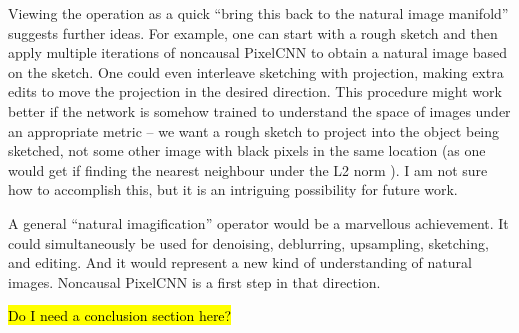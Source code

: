 \documentclass[10pt,a4paper]{article}
\newcommand{\nquote}[1]{``{#1}''}
\begin{document}
Viewing the operation as a quick \nquote{bring this back to the natural image manifold} suggests further ideas. For example, one can start with a rough sketch and then apply multiple iterations of noncausal PixelCNN to obtain a natural image based on the sketch. One could even interleave sketching with projection, making extra edits to move the projection in the desired direction. This procedure might work better if the network is somehow trained to understand the space of images under an appropriate metric -- we want a rough sketch to project into the object being sketched, not some other image with black pixels in the same location (as one would get if finding the nearest neighbour under the L2 norm \cite{??}). I am not sure how to accomplish this, but it is an intriguing possibility for future work.

A general \nquote{natural imagification} operator would be a marvellous achievement. It could simultaneously be used for denoising, deblurring, upsampling, sketching, and editing. And it would represent a new kind of understanding of natural images. Noncausal PixelCNN is a first step in that direction.

\hl{Do I need a conclusion section here?}


\end{document}
